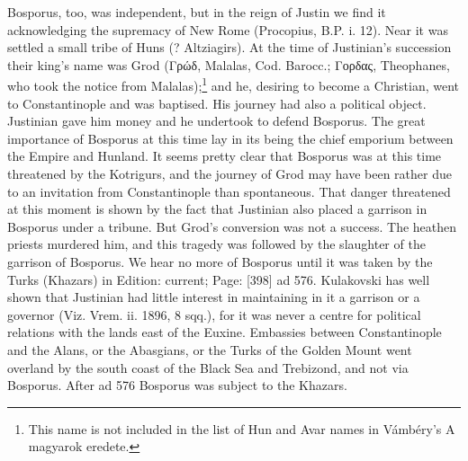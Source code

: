 Bosporus, too, was independent, but in the reign of Justin we find it acknowledging the supremacy of New Rome (Procopius, B.P. i. 12). Near it was settled a small tribe of Huns (? Altziagirs). At the time of Justinian\texthebrew{}’s succession their king\texthebrew{}’s name was Grod (\textgreek{Γρώδ}, Malalas, Cod. Barocc.; \textgreek{Γορδας}, Theophanes, who took the notice from Malalas);\footnote{This name is not included in the list of Hun and Avar names in Vámbéry\texthebrew{}’s A magyarok eredete.} and he, desiring to become a Christian, went to Constantinople and was baptised. His journey had also a political object. Justinian gave him money and he undertook to defend Bosporus. The great importance of Bosporus at this time lay in its being the chief emporium between the Empire and Hunland. It seems pretty clear that Bosporus was at this time threatened by the Kotrigurs, and the journey of Grod may have been rather due to an invitation from Constantinople than spontaneous. That danger threatened at this moment is shown by the fact that Justinian also placed a garrison in Bosporus under a tribune. But Grod\texthebrew{}’s conversion was not a success. The heathen priests murdered him, and this tragedy was followed by the slaughter of the garrison of Bosporus. We hear no more of Bosporus until it was taken by the Turks (Khazars) in Edition: current; Page: [398] ad 576. Kulakovski has well shown that Justinian had little interest in maintaining in it a garrison or a governor (Viz. Vrem. ii. 1896, 8 sqq.), for it was never a centre for political relations with the lands east of the Euxine. Embassies between Constantinople and the Alans, or the Abasgians, or the Turks of the Golden Mount went overland by the south coast of the Black Sea and Trebizond, and not via Bosporus. After ad 576 Bosporus was subject to the Khazars.

